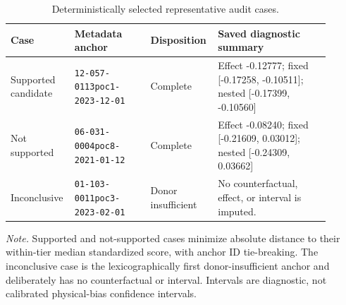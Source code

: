\begin{table}[tbp]
\centering
\caption{Deterministically selected representative audit cases.}
\label{tab:case-studies}
\footnotesize
\begin{tabular}{@{}p{0.16\linewidth}p{0.23\linewidth}p{0.17\linewidth}p{0.34\linewidth}@{}}
\toprule
Case & Metadata anchor & Disposition & Saved diagnostic summary \\
\midrule
Supported candidate & \texttt{12-057-0113}\newline\texttt{poc1-2023-12-01} & Complete & Effect -0.12777; fixed [-0.17258, -0.10511]; nested [-0.17399, -0.10560] \\
Not supported & \texttt{06-031-0004}\newline\texttt{poc8-2021-01-12} & Complete & Effect -0.08240; fixed [-0.21609, 0.03012]; nested [-0.24309, 0.03662] \\
Inconclusive & \texttt{01-103-0011}\newline\texttt{poc3-2023-02-01} & Donor insufficient & No counterfactual, effect, or interval is imputed. \\
\bottomrule
\end{tabular}
\par\smallskip
\begin{minipage}{0.94\linewidth}
\footnotesize\textit{Note.} Supported and not-supported cases minimize absolute distance to their within-tier median standardized score, with anchor ID tie-breaking. The inconclusive case is the lexicographically first donor-insufficient anchor and deliberately has no counterfactual or interval. Intervals are diagnostic, not calibrated physical-bias confidence intervals.
\end{minipage}
\end{table}
